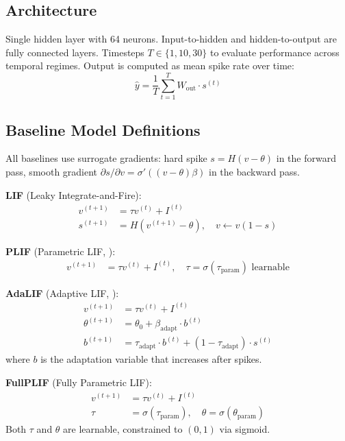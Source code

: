 \documentclass{article}
\theoremstyle{plain}
\theoremstyle{definition}
\theoremstyle{remark}
\begin{document}
\subsection{Architecture}

Single hidden layer with 64 neurons. Input-to-hidden and hidden-to-output are fully connected layers. Timesteps $T \in \{1, 10, 30\}$ to evaluate performance across temporal regimes. Output is computed as mean spike rate over time:
\begin{equation}
\hat{y} = \frac{1}{T}\sum_{t=1}^T W_{\text{out}} \cdot s^{(t)}
\end{equation}

\subsection{Baseline Model Definitions}

All baselines use surrogate gradients: hard spike $s = H(v - \theta)$ in the forward pass, smooth gradient $\partial s / \partial v = \sigma'((v-\theta)\beta)$ in the backward pass.

\textbf{LIF} (Leaky Integrate-and-Fire):
\begin{align}
v^{(t+1)} &= \tau v^{(t)} + I^{(t)} \\
s^{(t+1)} &= H(v^{(t+1)} - \theta), \quad v \leftarrow v(1-s)
\end{align}

\textbf{PLIF} (Parametric LIF, \citealp{fang2021incorporating}):
\begin{align}
v^{(t+1)} &= \tau v^{(t)} + I^{(t)}, \quad \tau = \sigma(\tau_{\text{param}}) \text{ learnable}
\end{align}

\textbf{AdaLIF} (Adaptive LIF, \citealp{bellec2018long}):
\begin{align}
v^{(t+1)} &= \tau v^{(t)} + I^{(t)} \\
\theta^{(t+1)} &= \theta_0 + \beta_{\text{adapt}} \cdot b^{(t)} \\
b^{(t+1)} &= \tau_{\text{adapt}} \cdot b^{(t)} + (1 - \tau_{\text{adapt}}) \cdot s^{(t)}
\end{align}
where $b$ is the adaptation variable that increases after spikes.

\textbf{FullPLIF} (Fully Parametric LIF):
\begin{align}
v^{(t+1)} &= \tau v^{(t)} + I^{(t)} \\
\tau &= \sigma(\tau_{\text{param}}), \quad \theta = \sigma(\theta_{\text{param}})
\end{align}
Both $\tau$ and $\theta$ are learnable, constrained to $(0, 1)$ via sigmoid.
\end{document}

